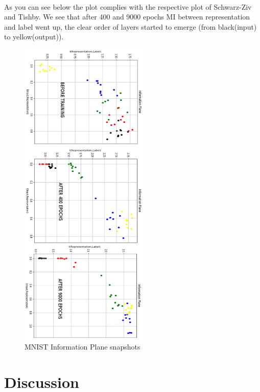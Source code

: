 \documentclass[a4paper,14pt]{extarticle}
\begin{document}
\paragraph{}
As you can see below the plot complies with the respective plot of Schwarz-Ziv and Tishby. We see that after 400 and 9000 epochs MI between representation and label went up, the clear order of layers started to emerge (from black(input) to yellow(output)).
\begin{figure}[h!]
	\centering
	\includegraphics[width=0.55\textwidth]{SnapshotReproduction.png}
	\caption{MNIST Information Plane snapshots}
\end{figure}
\section{Discussion}
\end{document}
